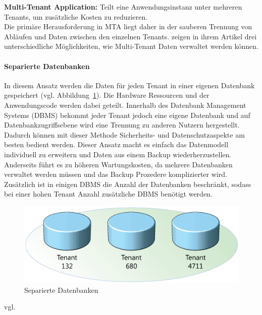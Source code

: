 \textbf{Multi-Tenant Application:} Teilt eine Anwendungsinstanz unter mehreren Tenants, um zusätzliche Kosten zu reduzieren. 
\\ 

Die primäre Herausforderung in MTA liegt daher in der sauberen Trennung von Abläufen und Daten zwischen den einzelnen Tenants. \cite{Chong.2006} zeigen in ihrem Artikel drei unterschiedliche Möglichkeiten, wie Multi-Tenant Daten verwaltet werden können.

\paragraph{Separierte Datenbanken}
In diesem Ansatz werden die Daten für jeden Tenant in einer eigenen Datenbank gespeichert (vgl. Abbildung~\ref{fig:separierteDatenbanken}). Die Hardware Ressourcen und der Anwendungscode werden dabei geteilt. Innerhalb des Datenbank Management Systems (DBMS) bekommt jeder Tenant jedoch eine eigene Datenbank und auf Datenbankzugriffsebene wird eine Trennung zu anderen Nutzern hergestellt. Dadurch können mit dieser Methode Sicherheits- und Datenschutzaspekte am besten bedient werden. Dieser Ansatz macht es einfach das Datenmodell individuell zu erweitern und Daten aus einem Backup wiederherzustellen. Anderseits führt es zu höheren Wartungskosten, da mehrere Datenbanken verwaltet werden müssen und das Backup Prozedere komplizierter wird. Zusätzlich ist in einigen DBMS die Anzahl der Datenbanken beschränkt, sodass bei einer hohen Tenant Anzahl zusätzliche DBMS benötigt werden.

\begin{figure}[h]
	\centering
	\includegraphics[width=0.7\linewidth]{images/separierte_datenbanken}
	\caption{Separierte Datenbanken}
	\label{fig:separierteDatenbanken}
\end{figure}
vgl.	
\\
\\
